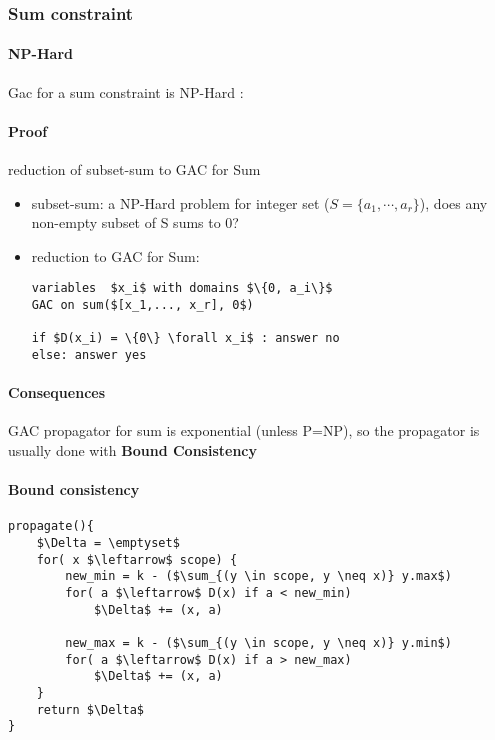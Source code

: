 \subsubsection{Sum constraint}

\paragraph{NP-Hard}
Gac for a sum constraint is NP-Hard :

\paragraph{Proof} reduction of subset-sum to GAC for Sum
\begin{itemize}
    \item subset-sum: a NP-Hard problem for integer set ($S=\{a_1,\cdots, a_r\}$),
        does any non-empty subset of S sums to 0?

    \item reduction to GAC for Sum:
        \begin{lstlisting}[mathescape]
variables  $x_i$ with domains $\{0, a_i\}$
GAC on sum($[x_1,..., x_r], 0$)

if $D(x_i) = \{0\} \forall x_i$ : answer no
else: answer yes
\end{lstlisting}
\end{itemize}

\paragraph{Consequences} GAC propagator for sum is exponential (unless P=NP), so
the propagator is usually done with \textbf{Bound Consistency}

\paragraph{Bound consistency}

\begin{lstlisting}[mathescape]
propagate(){
    $\Delta = \emptyset$
    for( x $\leftarrow$ scope) {
        new_min = k - ($\sum_{(y \in scope, y \neq x)} y.max$)
        for( a $\leftarrow$ D(x) if a < new_min)
            $\Delta$ += (x, a)

        new_max = k - ($\sum_{(y \in scope, y \neq x)} y.min$)
        for( a $\leftarrow$ D(x) if a > new_max)
            $\Delta$ += (x, a)
    }
    return $\Delta$
}
\end{lstlisting}


